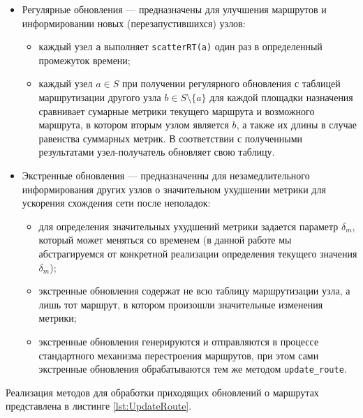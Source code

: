 \begin{itemize}
    \item Регулярные обновления --- предназначены для улучшения маршрутов и информировании новых (перезапустившихся) узлов:
    
    \begin{itemize}
        \item каждый узел \texttt{a} выполняет \texttt{scatterRT(a)} один раз в определенный промежуток времени;
        
        \item каждый узел $a \in S$ при получении регулярного обновления с таблицей маршрутизации другого узла $b \in S \setminus \{a\}$ для каждой площадки назначения сравнивает сумарные метрики текущего маршрута и возможного маршрута, в котором вторым узлом является $b$, а также их длины в случае равенства суммарных метрик. В соответствии с полученными результатами узел-получатель обновляет свою таблицу.
    \end{itemize}
    
    \item Экстренные обновления --- предназначенны для незамедлительного информирования других узлов о значительном ухудшении метрики для ускорения схождения сети после неполадок:
    
    \begin{itemize}
        \item для определения значительных ухудшений метрики задается параметр $\delta_m$, который может меняться со временем (в данной работе мы абстрагируемся от конкретной реализации определения текущего значения $\delta_m$);
        
        \item экстренные обновления содержат не всю таблицу маршрутизации узла, а лишь тот маршрут, в котором произошли значительные изменения метрики;
        
        \item экстренные обновления генерируются и отправляются в процессе стандартного механизма перестроения маршрутов, при этом сами экстренные обновления обрабатываются тем же методом \texttt{update\_route}.
    \end{itemize}
\end{itemize}

Реализация методов для обработки приходящих обновлений о маршрутах представлена в листинге \ref{lst:UpdateRoute}.

